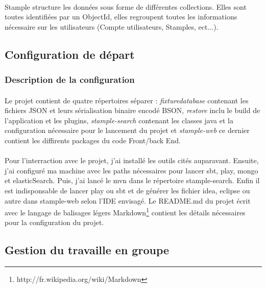 \paragraph{}
Stample structure les données sous forme de différentes collections.
Elles sont toutes identifiées par un ObjectId, elles regroupent toutes les informations nécessaire sur les utilisateurs (Compte utilisateurs, Stamples, ect...).
\newpage
\subsection{Configuration de départ}
\subsubsection{Description de la configuration}
\paragraph{}
Le projet contient de quatre répertoires séparer : \textit{fixturedatabase} contenant les fichiers JSON et leurs sérialisation binaire encodé BSON, \textit{restore} inclu le build de l'application et les plugins, \textit{stample-search} contenant les classes java et la configuration nécessaire pour le lancement du projet et \textit{stample-web} ce dernier contient les diffirents packages du code Front/back End.
\paragraph{}
Pour l'interraction avec le projet, j'ai installé les outils cités auparavant. Ensuite, j'ai configuré ma machine avec les paths nécessaires pour lancer sbt, play, mongo et elasticSearch. Puis, j'ai lancé le mvn dans le répertoire stample-search. Enfin il est indisponsable de lancer play ou sbt et de générer les fichier idea, eclipse ou autre dans stample-web selon l'IDE envisagé.    
Le README.md du projet écrit avec le langage de balisages légers Markdown\footnote{http://fr.wikipedia.org/wiki/Markdown} contient les détails nécessaires pour la configuration du projet.
\subsection{Gestion du travaille en groupe}
